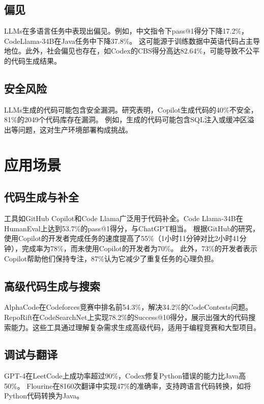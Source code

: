 \documentclass[11pt]{article}
\begin{document}
\subsection{偏见}
LLMs在多语言任务中表现出偏见。例如，中文指令下pass@1得分下降17.2\%，CodeLlama-34B在Java任务中下降37.8\%。%
这可能源于训练数据中英语代码占主导地位。此外，社会偏见也存在，如Codex的CBS得分高达82.64\%，可能导致不公平的代码生成结果。

\subsection{安全风险}
LLMs生成的代码可能包含安全漏洞。研究表明，Copilot生成代码的40\%不安全，81\%的2049个代码库存在漏洞。%
例如，生成的代码可能包含SQL注入或缓冲区溢出等问题，这对生产环境部署构成挑战。

\section{应用场景}
\subsection{代码生成与补全}
工具如GitHub Copilot和Code Llama广泛用于代码补全。Code Llama-34B在HumanEval上达到53.7\%的pass@1得分，与ChatGPT相当。%
根据GitHub的研究，使用Copilot的开发者完成任务的速度提高了55\%（1小时11分钟对比2小时41分钟），完成率为78\%，而未使用Copilot的开发者为70\%。%
此外，73\%的开发者表示Copilot帮助他们保持专注，87\%认为它减少了重复任务的心理负担。

\subsection{高级代码生成与搜索}
AlphaCode在Codeforces竞赛中排名前54.3\%，解决34.2\%的CodeContests问题。%
RepoRift在CodeSearchNet上实现78.2\%的Success@10得分，展示出强大的代码搜索能力。这些工具通过理解复杂需求生成高级代码，适用于编程竞赛和大型项目。

\subsection{调试与翻译}
GPT-4在LeetCode上成功率超过90\%，Codex修复Python错误的能力比Java高50\%。%
Flourine在8160次翻译中实现47\%的准确率，支持跨语言代码转换，如将Python代码转换为Java。
\end{document}
